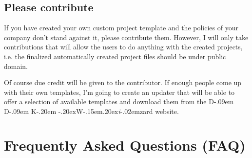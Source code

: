 \documentclass[a4paper,titlepage]{report}
\def\ddkwiz{D\kern-.09em D\kern-.09em K\kern-.20em \raise-.20ex\hbox{W}\kern-.15em\raise.20ex\hbox{\it{i}}\kern-.02em{zard}}
\begin{document}
\section{Please contribute}
If you have created your own custom project template and the policies of your company
don't stand against it, please contribute them. However, I will only take contributions
that will allow the users to do anything with the created projects, i.e. the finalized
automatically created project files should be under public domain.

Of course due credit will be given to the contributor. If enough people come up with
their own templates, I'm going to create an updater that will be able to offer a
selection of available templates and download them from the \ddkwiz{} website.

\chapter{Frequently Asked Questions (FAQ)}\thispagestyle{fancy}
\label{cha:faq}
\end{document}
